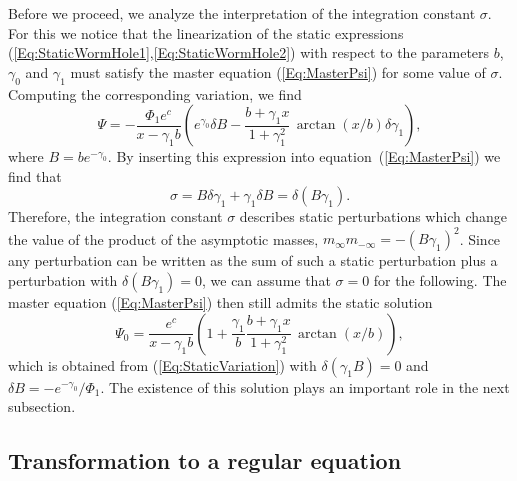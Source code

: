\documentclass[           %
               showpacs,            %
               preprintnumbers,     %
               aps,                 %
               prd,                 %
               superscriptaddress,      %
               nofootinbib,         %
               tightenlines,        %
               floats,floatfix      %
               ]{revtex4}
\begin{document}
Before we proceed, we analyze the interpretation of the integration
constant $\sigma$. For this we notice that the linearization of the
static expressions (\ref{Eq:StaticWormHole1},\ref{Eq:StaticWormHole2})
with respect to the parameters $b$, $\gamma_0$ and $\gamma_1$ must
satisfy the master equation (\ref{Eq:MasterPsi}) for some value of
$\sigma$. Computing the corresponding variation, we find
\begin{equation}
\Psi = -\frac{\Phi_1 e^c}{x - \gamma_1 b}\left( e^{\gamma_0}\delta B
 - \frac{b + \gamma_1 x}{1 + \gamma_1^2}\,\arctan(x/b) 
 \delta\gamma_1 \right),
\label{Eq:StaticVariation}
\end{equation}
where $B = b e^{-\gamma_0}$. By inserting this expression into
equation~(\ref{Eq:MasterPsi}) we find that
\begin{equation}
\sigma = B\delta\gamma_1 + \gamma_1\delta B = \delta(B\gamma_1).
\end{equation}
Therefore, the integration constant $\sigma$ describes static
perturbations which change the value of the product of the asymptotic
masses, $m_\infty m_{-\infty} = -(B\gamma_1)^2$. Since any
perturbation can be written as the sum of such a static perturbation
plus a perturbation with $\delta(B\gamma_1) = 0$, we can assume that
$\sigma = 0$ for the following. The master equation
(\ref{Eq:MasterPsi}) then still admits the static solution
\begin{equation}
\Psi_0 = \frac{e^c}{x - \gamma_1 b}\left( 1 + \frac{\gamma_1}{b}
  \frac{b + \gamma_1 x}{1 + \gamma_1^2}\,\arctan(x/b) \right),
\label{Eq:PsiZero}
\end{equation}
which is obtained from (\ref{Eq:StaticVariation}) with
$\delta(\gamma_1 B) = 0$ and $\delta B = -e^{-\gamma_0}/\Phi_1$. The
existence of this solution plays an important role in the next
subsection.



\subsection{Transformation to a regular equation}
\label{Sec:LinStabMasterNew}
\end{document}
